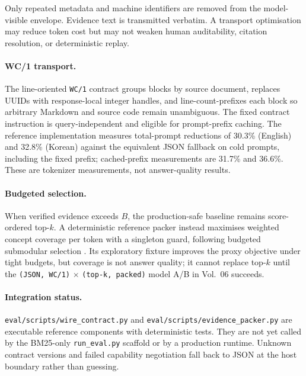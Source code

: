 \begin{designprinciple}
Only repeated metadata and machine identifiers are removed from the model-visible
envelope. Evidence text is transmitted verbatim. A transport optimisation may
reduce token cost but may not weaken human auditability, citation resolution,
or deterministic replay.
\end{designprinciple}

\paragraph{WC/1 transport.}
The line-oriented \texttt{WC/1} contract groups blocks by source document,
replaces UUIDs with response-local integer handles, and line-count-prefixes each
block so arbitrary Markdown and source code remain unambiguous. The fixed
contract instruction is query-independent and eligible for prompt-prefix
caching. The reference implementation measures total-prompt reductions of
30.3\% (English) and 32.8\% (Korean) against the equivalent JSON fallback on
cold prompts, including the fixed prefix; cached-prefix measurements are
31.7\% and 36.6\%. These are tokenizer measurements, not answer-quality results.

\paragraph{Budgeted selection.}
When verified evidence exceeds $B$, the production-safe baseline remains
score-ordered top-$k$. A deterministic reference packer instead maximises
weighted concept coverage per token with a singleton guard, following budgeted
submodular selection \citep{lin2010budgeted,peng2025adagres,bala2026survives}.
Its exploratory fixture improves the proxy objective under tight budgets, but
coverage is not answer quality; it cannot replace top-$k$ until the
\texttt{(JSON, WC/1)} $\times$ \texttt{(top-k, packed)} model A/B in
Vol.~06 succeeds.

\paragraph{Integration status.}
\texttt{eval/scripts/wire\_contract.py} and
\texttt{eval/scripts/evidence\_packer.py} are executable reference components
with deterministic tests. They are not yet called by the BM25-only
\texttt{run\_eval.py} scaffold or by a production runtime. Unknown contract
versions and failed capability negotiation fall back to JSON at the host
boundary rather than guessing.

